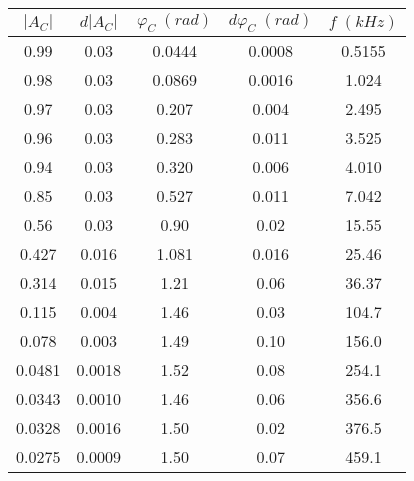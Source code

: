 \begin{tabular}{cc|cc|c}
\toprule
$|A_{C}|$ & $d|A_{C}|$ & $\varphi_{C} \; (rad)$ & $d\varphi_{C} \; (rad)$ & $f \; (kHz)$ \\
\midrule
     0.99 &       0.03 &                 0.0444 &                  0.0008 &       0.5155 \\
     0.98 &       0.03 &                 0.0869 &                  0.0016 &        1.024 \\
     0.97 &       0.03 &                  0.207 &                   0.004 &        2.495 \\
     0.96 &       0.03 &                  0.283 &                   0.011 &        3.525 \\
     0.94 &       0.03 &                  0.320 &                   0.006 &        4.010 \\
     0.85 &       0.03 &                  0.527 &                   0.011 &        7.042 \\
     0.56 &       0.03 &                   0.90 &                    0.02 &        15.55 \\
    0.427 &      0.016 &                  1.081 &                   0.016 &        25.46 \\
    0.314 &      0.015 &                   1.21 &                    0.06 &        36.37 \\
    0.115 &      0.004 &                   1.46 &                    0.03 &        104.7 \\
    0.078 &      0.003 &                   1.49 &                    0.10 &        156.0 \\
   0.0481 &     0.0018 &                   1.52 &                    0.08 &        254.1 \\
   0.0343 &     0.0010 &                   1.46 &                    0.06 &        356.6 \\
   0.0328 &     0.0016 &                   1.50 &                    0.02 &        376.5 \\
   0.0275 &     0.0009 &                   1.50 &                    0.07 &        459.1 \\
\bottomrule
\end{tabular}
